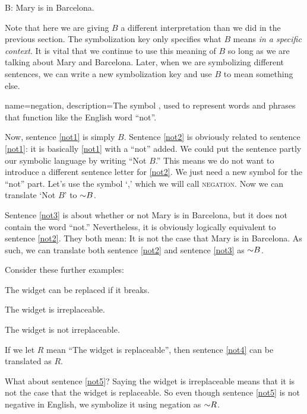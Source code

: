 \begin{ekey}
\item[B:]Mary is in Barcelona.
\end{ekey}

Note that here we are giving $B$ a different interpretation than we did in the previous section. The symbolization key only specifies what $B$ means \emph{in a specific context}. It is vital that we continue to use this meaning of $B$ so long as we are talking about Mary and Barcelona. Later, when we are symbolizing different sentences, we can write a new symbolization key and use $B$ to mean something else.

{
name=negation,
description={The symbol \enot, used to represent words and phrases that function like the English word ``not''.}
}

Now, sentence \ref{not1} is simply $B$. Sentence \ref{not2} is obviously related to sentence \ref{not1}: it is basically \ref{not1} with a ``not'' added. We could put the sentence partly our symbolic language by writing ``Not $B$.'' This means we do not want to introduce a different sentence letter for \ref{not2}. We just need a new symbol for the ``not'' part. Let's use the symbol `\enot,' which we will call \textsc{\gls{negation}}. \label{def:negation} Now we can translate `Not $B$' to $\mathord{\sim} B$. 

Sentence \ref{not3} is about whether or not Mary is in Barcelona, but it does not contain the word ``not.'' Nevertheless, it is obviously logically equivalent to sentence \ref{not2}. They both mean: It is not the case that Mary is in Barcelona. As such, we can translate both sentence \ref{not2} and sentence \ref{not3} as $\mathord{\sim} B$.



Consider these further examples:
\begin{earg}
\item[\ex{not4}] The widget can be replaced if it breaks.
\item[\ex{not5}] The widget is irreplaceable.
\item[\ex{not5b}] The widget is not irreplaceable.
\end{earg}


If we let $R$ mean ``The widget is replaceable'', then sentence \ref{not4} can be translated as $R$.

What about sentence \ref{not5}? Saying the widget is irreplaceable means that it is not the case that the widget is replaceable. So even though sentence \ref{not5} is not negative in English, we symbolize it using negation as $\mathord{\sim}{R}$.


